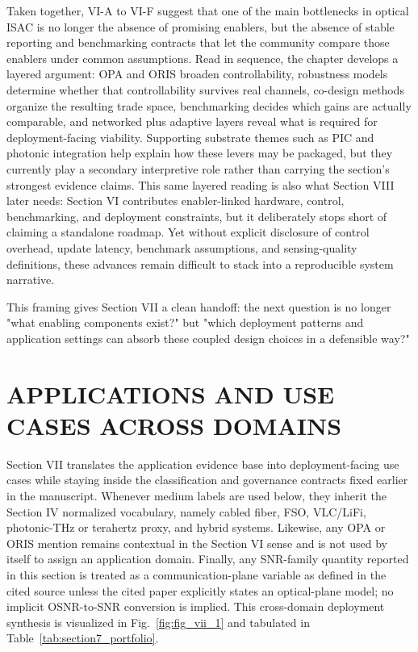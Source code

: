 \documentclass[lettersize,journal]{IEEEtran}
\begin{document}
Taken together, VI-A to VI-F suggest that one of the main bottlenecks in optical ISAC is no longer the absence of promising enablers, but the absence of stable reporting and benchmarking contracts that let the community compare those enablers under common assumptions. Read in sequence, the chapter develops a layered argument: OPA and ORIS broaden controllability, robustness models determine whether that controllability survives real channels, co-design methods organize the resulting trade space, benchmarking decides which gains are actually comparable, and networked plus adaptive layers reveal what is required for deployment-facing viability. Supporting substrate themes such as PIC and photonic integration help explain how these levers may be packaged, but they currently play a secondary interpretive role rather than carrying the section's strongest evidence claims. This same layered reading is also what Section VIII later needs: Section VI contributes enabler-linked hardware, control, benchmarking, and deployment constraints, but it deliberately stops short of claiming a standalone roadmap. Yet without explicit disclosure of control overhead, update latency, benchmark assumptions, and sensing-quality definitions, these advances remain difficult to stack into a reproducible system narrative.

This framing gives Section VII a clean handoff: the next question is no longer "what enabling components exist?" but "which deployment patterns and application settings can absorb these coupled design choices in a defensible way?"


\section{APPLICATIONS AND USE CASES ACROSS DOMAINS}

Section VII translates the application evidence base into deployment-facing use cases while staying inside the classification and governance contracts fixed earlier in the manuscript. Whenever medium labels are used below, they inherit the Section IV normalized vocabulary, namely cabled fiber, FSO, VLC/LiFi, photonic-THz or terahertz proxy, and hybrid systems. Likewise, any OPA or ORIS mention remains contextual in the Section VI sense and is not used by itself to assign an application domain. Finally, any SNR-family quantity reported in this section is treated as a communication-plane variable as defined in the cited source unless the cited paper explicitly states an optical-plane model; no implicit OSNR-to-SNR conversion is implied. This cross-domain deployment synthesis is visualized in Fig.~\ref{fig:fig_vii_1} and tabulated in Table~\ref{tab:section7_portfolio}.
\end{document}
